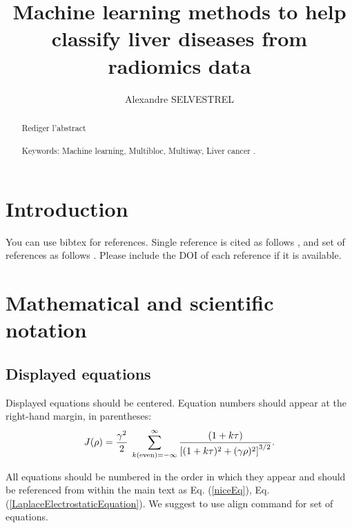 \documentclass[10pt]{article}
\title{Machine learning methods to help classify liver diseases from radiomics data}
\author[1]{Alexandre SELVESTREL}
\affil[1]{Laboratoire des syst\`emes, Orsay France}
\affil[2]{Centrale-Sup\'elec, Gif-sur-Yvette France}
\begin{document}
    \date{}
    \maketitle

\begin{abstract}
Rediger l'abstract
\\\\Keywords: Machine learning, Multibloc, Multiway, Liver cancer .  
\end{abstract}


\section{Introduction}
You can use bibtex for references. Single reference is cited as follows \cite{chiaverini2005surface}, and set of references as follows \cite{leibfried2005surface,seidelin2006microfabricated,daniilidis2011fabrication}. Please include the DOI of each reference if it is available.

\blindtext

\section{Mathematical and scientific notation}

\subsection{Displayed equations} Displayed equations should be centered.
Equation numbers should appear at the right-hand margin, in
parentheses:
\begin{equation}
J(\rho) =
 \frac{\gamma^2}{2} \; \sum_{k({\rm even}) = -\infty}^{\infty}
	\frac{(1 + k \tau)}{ \left[ (1 + k \tau)^2 + (\gamma  \rho)^2  \right]^{3/2} }.
	\label{niceEq}
\end{equation}

All equations should be numbered in the order in which they appear
and should be referenced  from within the main text as Eq. (\ref{niceEq}),
Eq. (\ref{LaplaceElectrostaticEquation}). We suggest to use align command for set of equations.
\end{document}
